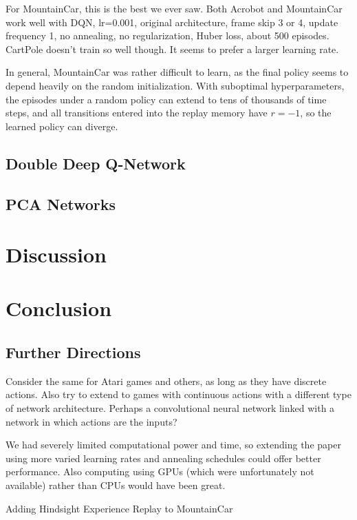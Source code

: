 \documentclass[11pt, twocolumn]{article}
\begin{document}
For MountainCar, this is the best we ever saw. Both Acrobot and MountainCar work well with DQN, lr=0.001, original architecture, frame skip 3 or 4, update frequency 1, no annealing, no regularization, Huber loss, about 500 episodes. CartPole doesn't train so well though. It seems to prefer a larger learning rate.

In general, MountainCar was rather difficult to learn, as the final policy seems to depend heavily on the random initialization. With suboptimal hyperparameters, the episodes under a random policy can extend to tens of thousands of time steps, and all transitions entered into the replay memory have $r = -1$, so the learned policy can diverge. 

\subsection{Double Deep Q-Network}

\subsection{PCA Networks}


\section{Discussion}
\section{Conclusion}

\subsection{Further Directions}

Consider the same for Atari games and others, as long as they have discrete actions. Also try to extend to games with continuous actions with a different type of network architecture. Perhaps a convolutional neural network linked with a network in which actions are the inputs?

We had severely limited computational power and time, so extending the paper using more varied learning rates and annealing schedules could offer better performance. Also computing using GPUs (which were unfortunately not available) rather than CPUs would have been great.

Adding Hindsight Experience Replay to MountainCar

\newpage
{}

\end{document}

